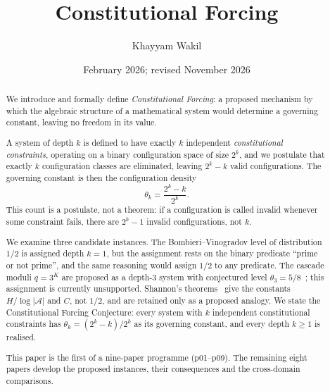 \documentclass[12pt]{amsart}
\title[Constitutional Forcing]{Constitutional Forcing}
\author{Khayyam Wakil}
\date{February 2026; revised November 2026}
\theoremstyle{plain}
\theoremstyle{definition}
\theoremstyle{remark}
\newcommand{\thetak}{\theta_k}
\begin{document}
\begin{abstract}
We introduce and formally define \emph{Constitutional Forcing}: a proposed
mechanism by which the algebraic structure of a mathematical system would
determine a governing constant, leaving no freedom in its value.

A system of depth $k$ is defined to have exactly $k$ independent
\emph{constitutional constraints}, operating on a binary configuration space of
size $2^k$, and we postulate that exactly $k$ configuration classes are
eliminated, leaving $2^k - k$ valid configurations. The governing constant is
then the configuration density
\begin{equation*}
  \thetak = \frac{2^k - k}{2^k}.
\end{equation*}
This count is a postulate, not a theorem: if a configuration is called invalid
whenever some constraint fails, there are $2^k - 1$ invalid configurations,
not $k$.

We examine three candidate instances. The Bombieri--Vinogradov level of
distribution $1/2$ is assigned depth $k = 1$, but the assignment rests on the
binary predicate ``prime or not prime'', and the same reasoning would assign
$1/2$ to any predicate. The cascade moduli $q = 3^K$ are proposed as a depth-$3$
system with conjectured level $\theta_3 = 5/8$~\cite{WakilEisenstein}; this
assignment is currently unsupported. Shannon's theorems~\cite{Shannon1948}
give the constants $H/\log|\mathcal{A}|$ and $C$, not $1/2$, and are retained
only as a proposed analogy. We state the Constitutional Forcing Conjecture:
every system with $k$ independent constitutional constraints has
$\thetak = (2^k - k)/2^k$ as its governing constant, and every depth
$k \geq 1$ is realised.

This paper is the first of a nine-paper programme (p01--p09). The remaining
eight papers develop the proposed instances, their consequences and the
cross-domain comparisons.
\end{abstract}

\maketitle
\end{document}
